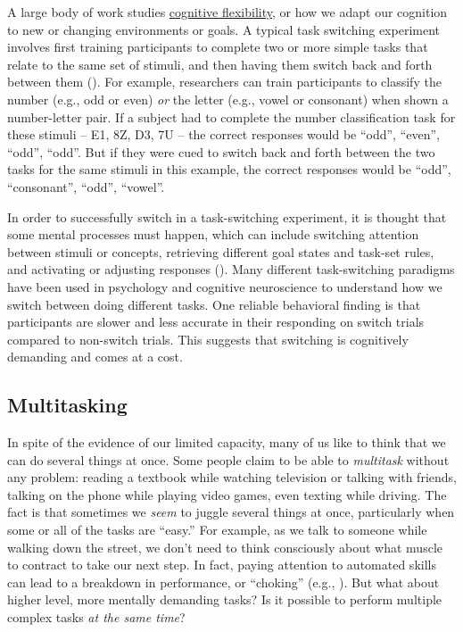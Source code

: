 \documentclass[
]{krantz}
\begin{document}
A large body of work studies \hyperref[cognitive-flexibility]{cognitive flexibility}, or how we adapt our cognition to new or changing environments or goals. A typical task switching experiment involves first training participants to complete two or more simple tasks that relate to the same set of stimuli, and then having them switch back and forth between them (). For example, researchers can train participants to classify the number (e.g., odd or even) \emph{or} the letter (e.g., vowel or consonant) when shown a number-letter pair. If a subject had to complete the number classification task for these stimuli -- E1, 8Z, D3, 7U -- the correct responses would be ``odd'', ``even'', ``odd'', ``odd''. But if they were cued to switch back and forth between the two tasks for the same stimuli in this example, the correct responses would be ``odd'', ``consonant'', ``odd'', ``vowel''.

In order to successfully switch in a task-switching experiment, it is thought that some mental processes must happen, which can include switching attention between stimuli or concepts, retrieving different goal states and task-set rules, and activating or adjusting responses (). Many different task-switching paradigms have been used in psychology and cognitive neuroscience to understand how we switch between doing different tasks. One reliable behavioral finding is that participants are slower and less accurate in their responding on switch trials compared to non-switch trials. This suggests that switching is cognitively demanding and comes at a cost.

\subsection*{Multitasking}\label{multitasking}


In spite of the evidence of our limited capacity, many of us like to think that we can do several things at once. Some people claim to be able to \emph{multitask} without any problem: reading a textbook while watching television or talking with friends, talking on the phone while playing video games, even texting while driving. The fact is that sometimes we \emph{seem} to juggle several things at once, particularly when some or all of the tasks are ``easy.'' For example, as we talk to someone while walking down the street, we don't need to think consciously about what muscle to contract to take our next step. In fact, paying attention to automated skills can lead to a breakdown in performance, or ``choking'' (e.g., ). But what about higher level, more mentally demanding tasks? Is it possible to perform multiple complex tasks \emph{at the same time}?
\end{document}

